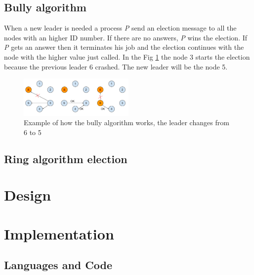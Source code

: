 \documentclass[11pt,conference]{IEEEtran}
\begin{document}
\subsection{Bully algorithm}
When a new leader is needed a process \textit{P} send an election message to all the nodes with an higher ID number. If there are no answers, \textit{P} wins the election. If \textit{P} gets an answer then it terminates his job and the election continues with the node with the higher value just called. In the Fig \ref{fig:bully} the node 3 starts the election because the previous leader 6 crashed. The new leader will be the node 5.
\begin{figure}[h!]
  \centering
    \includegraphics[width=0.5\textwidth]{bully}
    \caption{Example of how the bully algorithm works, the leader changes from 6 to 5}
    \label{fig:bully}
\end{figure}

\subsection{Ring algorithm election}


\section{Design}


\section{Implementation}


\subsection{Languages and Code}
\end{document}
